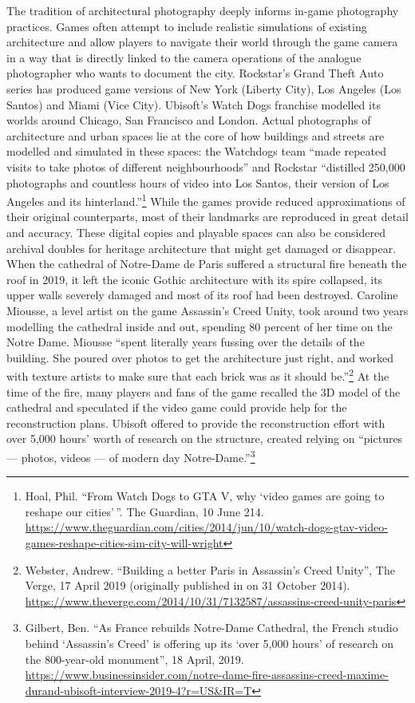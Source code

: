 \documentclass[
  openany]{book}
\begin{document}
The tradition of architectural photography deeply informs in-game photography practices. Games often attempt to include realistic simulations of existing architecture and allow players to navigate their world through the game camera in a way that is directly linked to the camera operations of the analogue photographer who wants to document the city. Rockstar's Grand Theft Auto series has produced game versions of New York (Liberty City), Los Angeles (Los Santos) and Miami (Vice City). Ubisoft's Watch Dogs franchise modelled its worlds around Chicago, San Francisco and London. Actual photographs of architecture and urban spaces lie at the core of how buildings and streets are modelled and simulated in these spaces: the Watchdogs team ``made repeated visits to take photos of different neighbourhoods'' and Rockstar ``distilled 250,000 photographs and countless hours of video into Los Santos, their version of Los Angeles and its hinterland.''\footnote{Hoal, Phil. ``From Watch Dogs to GTA V, why `video games are going to reshape our cities'\,''. The Guardian, 10 June 214. \url{https://www.theguardian.com/cities/2014/jun/10/watch-dogs-gtav-video-games-reshape-cities-sim-city-will-wright}}
While the games provide reduced approximations of their original counterparts, most of their landmarks are reproduced in great detail and accuracy. These digital copies and playable spaces can also be considered archival doubles for heritage architecture that might get damaged or disappear. When the cathedral of Notre-Dame de Paris suffered a structural fire beneath the roof in 2019, it left the iconic Gothic architecture with its spire collapsed, its upper walls severely damaged and most of its roof had been destroyed. Caroline Miousse, a level artist on the game Assassin's Creed Unity, took around two years modelling the cathedral inside and out, spending 80 percent of her time on the Notre Dame. Miousse ``spent literally years fussing over the details of the building. She poured over photos to get the architecture just right, and worked with texture artists to make sure that each brick was as it should be.''\footnote{Webster, Andrew. ``Building a better Paris in Assassin's Creed Unity'', The Verge, 17 April 2019 (originally published in on 31 October 2014). \url{https://www.theverge.com/2014/10/31/7132587/assassins-creed-unity-paris}} At the time of the fire, many players and fans of the game recalled the 3D model of the cathedral and speculated if the video game could provide help for the reconstruction plans. Ubisoft offered to provide the reconstruction effort with over 5,000 hours' worth of research on the structure, created relying on ``pictures --- photos, videos --- of modern day Notre-Dame.''\footnote{Gilbert, Ben. ``As France rebuilds Notre-Dame Cathedral, the French studio behind `Assassin's Creed' is offering up its `over 5,000 hours' of research on the 800-year-old monument'', 18 April, 2019. \url{https://www.businessinsider.com/notre-dame-fire-assassins-creed-maxime-durand-ubisoft-interview-2019-4?r=US\&IR=T}}
\end{document}

